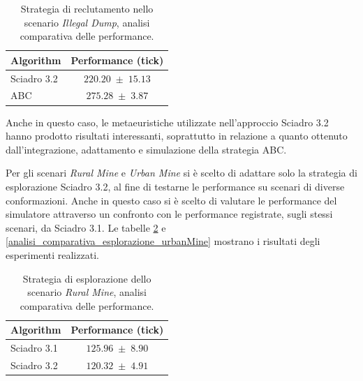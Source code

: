 \begin{table}[H]
    \centering
    \captionsetup{justification=centering, margin=2cm, font=footnotesize}
    \begin{tabular}{|l|c|}
    \hline
    \textbf{Algorithm}              & \textbf{Performance (tick)}       \\ \hline
    Sciadro 3.2                     & $220.20 \; \pm \; 15.13$           \\ \hline
    ABC                             & $275.28 \; \pm \; 3.87$           \\ \hline
    \end{tabular}%
    
    \caption{Strategia di reclutamento nello scenario \textit{Illegal Dump}, analisi comparativa delle performance.}
    \label{analisi_comparativa_reclutamento_dump}
\end{table}

Anche in questo caso, le metaeuristiche utilizzate nell'approccio Sciadro 3.2 hanno prodotto risultati interessanti, soprattutto in relazione a quanto ottenuto dall'integrazione, adattamento e simulazione della strategia ABC.

Per gli scenari \textit{Rural Mine} e \textit{Urban Mine} si è scelto di adattare solo la strategia di esplorazione Sciadro 3.2, al fine di testarne le performance su scenari di diverse conformazioni.
Anche in questo caso si è scelto di valutare le performance del simulatore attraverso un confronto con le performance registrate, sugli stessi scenari, da Sciadro 3.1.
Le tabelle \ref{analisi_comparativa_esplorazione_ruralMine} e \ref{analisi_comparativa_esplorazione_urbanMine} mostrano i risultati degli esperimenti realizzati.

\begin{table}[H]
    \centering
    \captionsetup{justification=centering, margin=2cm, font=footnotesize}
    \begin{tabular}{|l|c|}
    \hline
    \textbf{Algorithm}              & \textbf{Performance (tick)}       \\ \hline
    Sciadro 3.1                     & $125.96 \; \pm \; 8.90$           \\ \hline
    Sciadro 3.2                     & $120.32 \; \pm \; 4.91$           \\ \hline
    \end{tabular}%
    
    \caption{Strategia di esplorazione dello scenario \textit{Rural Mine}, analisi comparativa delle performance.}
    \label{analisi_comparativa_esplorazione_ruralMine}
\end{table}

